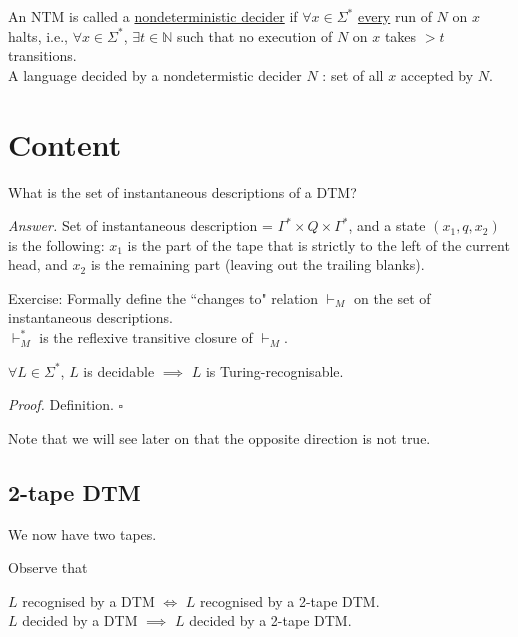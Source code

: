 \documentclass[a4paper]{article}
\newenvironment{proof}{\begin{breakbox}\textit{Proof.}}{\hfill$\square$\end{breakbox}}
\newenvironment{ans}{\begin{breakbox}\textit{Answer.}}{\end{breakbox}}
\newcommand{\nl}{\vspace{0.2cm}\\}
\newcommand{\mb}{\mathbb}
\newcommand{\changesto}{\vdash}
\begin{document}
\begin{defn}
    An NTM is called a \underline{nondeterministic decider} if $\forall x \in \Sigma^*$ \underline{every} run of $N$ on $x$ halts, i.e., $\forall x \in \Sigma^*$, $\exists t \in \mb{N}$ such
    that no execution of $N$ on $x$ takes $>t$ transitions.\nl
    A language decided by a nondetermistic decider $N$ : set of all $x$ accepted by $N$.\nl
\end{defn}

\section{Content}

\begin{ques}
    What is the set of instantaneous descriptions of a DTM?
\end{ques}

\begin{ans}
    Set of instantaneous description = $\Gamma^* \times Q \times \Gamma^*$, and a state $(x_1, q, x_2)$ is the following:    
    $x_1$ is the part of the tape that is strictly to the left of the current head, and $x_2$ is the remaining part (leaving out the trailing blanks).
    
\end{ans}

    Exercise: Formally define the ``changes to" relation $\changesto_M$ on the set of instantaneous descriptions.\nl
    $\changesto^*_M$ is the reflexive transitive closure of $\changesto_M$.\nl

\begin{claim}
        $\forall L \in \Sigma^*$, $L$ is decidable $\implies$ $L$ is Turing-recognisable.
\end{claim}
\begin{proof}
        Definition.
\end{proof}

Note that we will see later on that the opposite direction is not true.\nl

\subsection{2-tape DTM}

We now have two tapes.

Observe that

\begin{theorem}
        $L$ recognised by a DTM $\iff$ $L$ recognised by a 2-tape DTM.\nl
        $L$ decided by a DTM $\implies$ $L$ decided by a 2-tape DTM.
\end{theorem}
\end{document}
